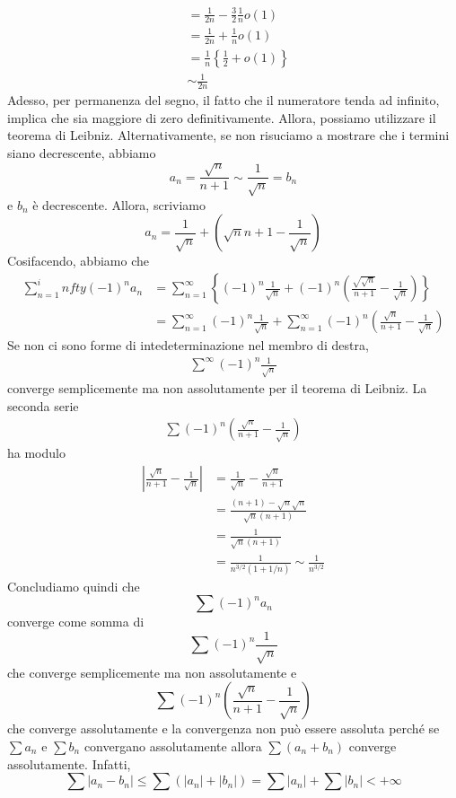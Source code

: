\documentclass[a4paper]{article}
\begin{document}
{\begin{align*}
        &= \frac{1}{2n} - \frac{3}{2}\frac{1}{n}o(1) \\
        &= \frac{1}{2n} + \frac{1}{n}o(1) \\
        &= \frac{1}{n} \left\{\frac{1}{2} + o(1)\right\} \\
        &\sim \frac{1}{2n}
    \end{align*}
    Adesso, per permanenza del segno, il fatto che il numeratore tenda ad infinito, implica che sia maggiore di zero
    definitivamente.
    Allora, possiamo utilizzare il teorema di Leibniz.
    Alternativamente, se non risuciamo a mostrare che i termini siano decrescente, abbiamo
    \[a_n = \frac{\sqrt{n}}{n+1} \sim \frac{1}{\sqrt{n}} = b_n\]
    e \(b_n\) è decrescente. Allora, scriviamo \[
        a_n = \frac{1}{\sqrt{n}} + \left(\sqrt{n}{n+1} - \frac{1}{\sqrt{n}}\right)
    \]
    Cosifacendo, abbiamo che
    \begin{align*}
        \sum_{n=1}^infty {(-1)}^n a_n &= \sum_{n=1}^\infty \left\{ {(-1)}^n \frac{1}{\sqrt{n}} + {(-1)}^n \left(
            \frac{\sqrt{\sqrt{n}}}{n+1} - \frac{1}{\sqrt{n}}
        \right)\right\} \\
        &= \sum_{n=1}^\infty {(-1)}^n \frac{1}{\sqrt{n}} + \sum_{n=1}^\infty {(-1)}^n
        \left(\frac{\sqrt{n}}{n+1} - \frac{1}{\sqrt{n}}\right)
    \end{align*}
    Se non ci sono forme di intedeterminazione nel membro di destra,
    \begin{align*}
        \sum^\infty {(-1)}^n \frac{1}{\sqrt{n}}
    \end{align*}
    converge semplicemente ma non assolutamente per il teorema di Leibniz.
    La seconda serie
    \begin{align*}
        \sum {(-1)}^n \left(
            \frac{\sqrt{n}}{n+1} - \frac{1}{\sqrt{n}}
        \right)
    \end{align*}
    ha modulo
    \begin{align*}
        \left| \frac{\sqrt{n}}{n+1} - \frac{1}{\sqrt{n}} \right| &= \frac{1}{\sqrt{n}} - \frac{\sqrt{n}}{n+1} \\
            &= \frac{(n+1) - \sqrt{n}\sqrt{n}}{\sqrt{n}(n+1)} \\
            &= \frac{1}{\sqrt{n}(n+1)} \\
            &= \frac{1}{n^{3/2}(1 + 1/n)} \sim \frac{1}{n^{3/2}}
    \end{align*}
    Concludiamo quindi che
    \[
        \sum {(-1)}^n a_n
    \]
    converge come somma di
    \[
        \sum {(-1)}^n \frac{1}{\sqrt{n}}
    \]
    che converge semplicemente ma non assolutamente e
    \[
        \sum {(-1)}^n \left( \frac{\sqrt{n}}{n+1} - \frac{1}{\sqrt{n}} \right)
    \]
    che converge assolutamente e la convergenza non può essere assoluta perché
    se \(\sum a_n\) e \(\sum b_n\) convergano assolutamente allora \(\sum (a_n + b_n)\)
    converge assolutamente. Infatti,
    \[
        \sum |a_n - b_n| \leq \sum (|a_n| + |b_n|)
        = \sum |a_n| + \sum |b_n| < +\infty
    \]
}
\end{document}
